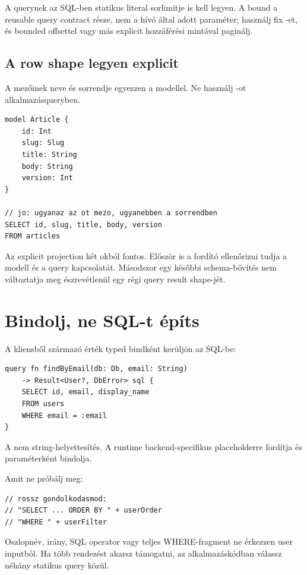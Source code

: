 A  querynek az SQL-ben statikus literal sorlimitje is kell legyen. A bound a reusable query contract része, nem a hívó által adott  paraméter; használj fix -et, és bounded offsettel vagy más explicit hozzáférési mintával paginálj.

\subsection*{A row shape legyen explicit}

A  mezőinek neve és sorrendje egyezzen a modellel. Ne használj -ot alkalmazásqueryben.

\begin{lstlisting}[language=RWLang]
model Article {
    id: Int
    slug: Slug
    title: String
    body: String
    version: Int
}

// jo: ugyanaz az ot mezo, ugyanebben a sorrendben
SELECT id, slug, title, body, version
FROM articles
\end{lstlisting}

Az explicit projection két okból fontos. Először is a fordító ellenőrizni tudja a modell és a query kapcsolatát. Másodszor egy későbbi schema-bővítés nem változtatja meg észrevétlenül egy régi query result shape-jét.

\section{Bindolj, ne SQL-t építs}

A kliensből származó érték typed bindként kerüljön az SQL-be:

\begin{lstlisting}[language=RWLang]
query fn findByEmail(db: Db, email: String)
    -> Result<User?, DbError> sql {
    SELECT id, email, display_name
    FROM users
    WHERE email = :email
}
\end{lstlisting}

A  nem string-helyettesítés. A runtime backend-specifikus placeholderre fordítja és paraméterként bindolja.

Amit ne próbálj meg:

\begin{lstlisting}
// rossz gondolkodasmod:
// "SELECT ... ORDER BY " + userOrder
// "WHERE " + userFilter
\end{lstlisting}

Oszlopnév,  irány, SQL operator vagy teljes WHERE-fragment ne érkezzen user inputból. Ha több rendezést akarsz támogatni, az alkalmazáskódban válassz néhány statikus query közül.

